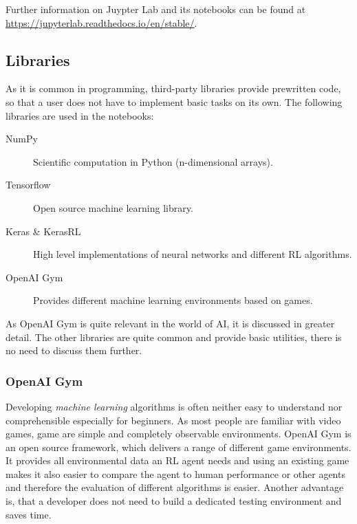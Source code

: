 \documentclass[10pt,a4paper]{article}
\begin{document}
		Further information on Juypter Lab and its notebooks can be found at \url{https://jupyterlab.readthedocs.io/en/stable/}.
		
		\subsection{Libraries}
		As it is common in programming, third-party libraries provide prewritten code, so that a user does not have to implement basic tasks on its own.
		The following libraries are used in the notebooks:
		\begin{description}
			\item[NumPy] Scientific computation in Python (n-dimensional arrays).
			\item[Tensorflow] Open source machine learning library.
			\item[Keras \& KerasRL] High level implementations of neural networks and different RL algorithms. 
			\item[OpenAI Gym] Provides different machine learning environments based on games.
		\end{description}
		
		\noindent As OpenAI Gym is quite relevant in the world of AI, it is discussed in greater detail. The other libraries are quite common and provide basic utilities, there is no need to discuss them further. 
		
		\subsubsection{OpenAI Gym}
		Developing \textit{machine learning} algorithms is often neither easy to understand nor comprehensible especially for beginners.
		As most people are familiar with video games, game are simple and completely observable environments.
		OpenAI Gym is an open source framework, which delivers a range of different game environments. It provides all environmental data an RL agent needs and using an existing game makes it also easier to compare the agent to human performance or other agents and therefore the evaluation of different algorithms is easier.
		Another advantage is, that a developer does not need to build a dedicated testing environment and saves time.
		
\end{document}
